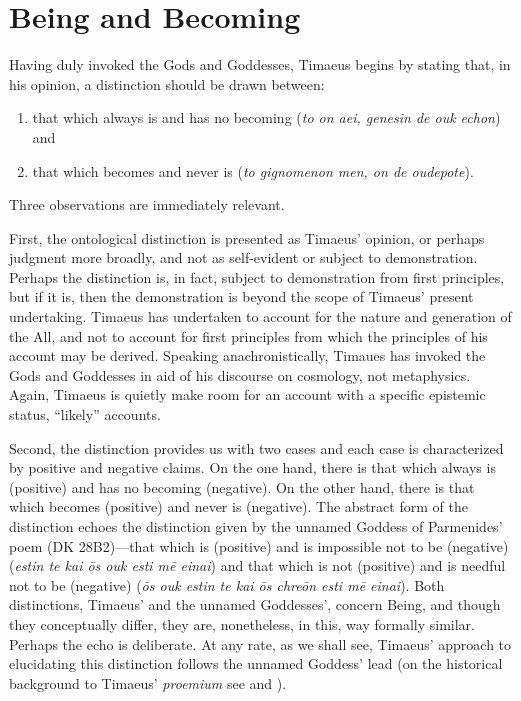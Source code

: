 
\section{Being and Becoming} %
\label{sec:Being and Becoming}

Having duly invoked the Gods and Goddesses, Timaeus begins by stating that, in his opinion, a distinction should be drawn between: 
\begin{enumerate}[(1)]
	\item that which always is and has no becoming (\emph{to on aei, genesin de ouk echon}) and
	\item that which becomes and never is (\emph{to gignomenon men, on de oudepote}).
\end{enumerate}
Three observations are immediately relevant. 

First, the ontological distinction is presented as Timaeus' opinion, or perhaps judgment more broadly, and not as self-evident or subject to demonstration. Perhaps the distinction is, in fact, subject to demonstration from first principles, but if it is, then the demonstration is beyond the scope of Timaeus' present undertaking. Timaeus has undertaken to account for the nature and generation of the All, and not to account for first principles from which the principles of his account may be derived. Speaking anachronistically, Timaues has invoked the Gods and Goddesses in aid of his discourse on cosmology, not metaphysics. Again, Timaeus is quietly make room for an account with a specific epistemic status, ``likely'' accounts.

Second, the distinction provides us with two cases and each case is characterized by positive and negative claims. On the one hand, there is that which always is (positive) and has no becoming (negative). On the other hand, there is that which becomes (positive) and never is (negative). The abstract form of the distinction echoes the distinction given by the unnamed Goddess of Parmenides' poem (DK 28B2)---that which is (positive) and is impossible not to be (negative) (\emph{estin te kai ōs ouk esti mē einai}) and that which is not (positive) and is needful not to be (negative) (\emph{ōs ouk estin te kai ōs chreōn esti mē einai}). Both distinctions, Timaeus' and the unnamed Goddesses', concern Being, and though they conceptually differ, they are, nonetheless, in this, way formally similar. Perhaps the echo is deliberate. At any rate, as we shall see, Timaeus' approach to elucidating this distinction follows the unnamed Goddess' lead (on the historical background to Timaeus' \emph{proemium} see \citealt{Naddaf:1997jt} and \citealt{Runia:1997vz}).

